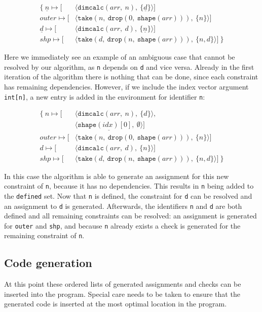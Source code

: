 \documentclass[sigconf,screen]{acmart}
\begin{document}
\begin{align*}
  \mathbf{\{}\
    \underline{n} \mapsto [&\langle\texttt{dimcalc}(arr,\ n),\ \{\underline{d}\}\rangle] \\
    outer         \mapsto [&\langle\texttt{take}(n,\ \texttt{drop}(0,\ \texttt{shape}(arr))),\ \{n\}\rangle] \\
    \underline{d} \mapsto [&\langle\texttt{dimcalc}(arr,\ d),\ \{\underline{n}\}\rangle] \\
    shp           \mapsto [&\langle\texttt{take}(d,\ \texttt{drop}(n,\ \texttt{shape}(arr))),\ \{n,d\}\rangle]
  \ \mathbf{\}}
\end{align*}

Here we immediately see an example of an ambiguous case that cannot be resolved by our algorithm, as \texttt{n} depends on \texttt{d} and vice versa.
Already in the first iteration of the algorithm there is nothing that can be done, since each constraint has remaining dependencies.
However, if we include the index vector argument \texttt{int[n]}, a new entry is added in the environment for identifier \texttt{n}:

\begin{align*}
  \mathbf{\{}\
    n \mapsto [&\langle\texttt{dimcalc}(arr,\ n),\ \{d\}\rangle, \\
      &\underline{\langle\texttt{shape}(idx)[0],\ \emptyset\rangle}] \\
    outer \mapsto [&\langle\texttt{take}(n,\ \texttt{drop}(0,\ \texttt{shape}(arr))),\ \{n\}\rangle] \\
    d \mapsto [&\langle\texttt{dimcalc}(arr,\ d),\ \{n\}\rangle] \\
    shp \mapsto [&\langle\texttt{take}(d,\ \texttt{drop}(n,\ \texttt{shape}(arr))),\ \{n,d\}\rangle]
  \ \mathbf{\}}
\end{align*}

In this case the algorithm is able to generate an assignment for this new constraint of \texttt{n}, because it has no dependencies.
This results in \texttt{n} being added to the \texttt{defined} set.
Now that \texttt{n} is defined, the constraint for \texttt{d} can be resolved and an assignment to \texttt{d} is generated.
Afterwards, the identifiers \texttt{n} and \texttt{d} are both defined and all remaining constraints can be resolved: an assignment is generated for \texttt{outer} and \texttt{shp}, and because \texttt{n} already exists a check is generated for the remaining constraint of \texttt{n}.

\subsection{Code generation}\label{sec:generation}
At this point these ordered lists of generated assignments and checks can be inserted into the program.
Special care needs to be taken to ensure that the generated code is inserted at the most optimal location in the program.
\end{document}
